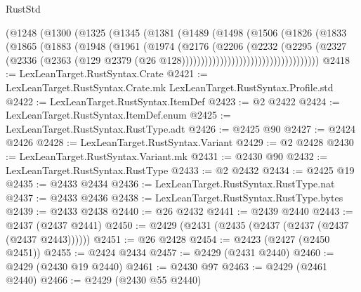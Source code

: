 \begin{lexlean}{RustStd}
\begin{coremodule}
                            (@1248
                              (@1300
                                (@1325
                                  (@1345
                                    (@1381
                                      (@1489
                                        (@1498
                                          (@1506
                                            (@1826
                                              (@1833
                                                (@1865
                                                  (@1883
                                                    (@1948
                                                      (@1961
                                                        (@1974
                                                          (@2176
                                                            (@2206
                                                              (@2232
                                                                (@2295
                                                                  (@2327
                                                                    (@2336
                                                                      (@2363
                                                                        (@129
                                                                          @2379
                                                                          (@26
                                                                            @128))))))))))))))))))))))))))))))))))))
@2418 := LexLeanTarget.RustSyntax.Crate
@2421 := LexLeanTarget.RustSyntax.Crate.mk LexLeanTarget.RustSyntax.Profile.std
@2422 := LexLeanTarget.RustSyntax.ItemDef
@2423 := @2 @2422
@2424 := LexLeanTarget.RustSyntax.ItemDef.enum
@2425 := LexLeanTarget.RustSyntax.RustType.adt
@2426 := @2425 @90
@2427 := @2424 @2426
@2428 := LexLeanTarget.RustSyntax.Variant
@2429 := @2 @2428
@2430 := LexLeanTarget.RustSyntax.Variant.mk
@2431 := @2430 @90
@2432 := LexLeanTarget.RustSyntax.RustType
@2433 := @2 @2432
@2434 := @2425 @19
@2435 := @2433 @2434
@2436 := LexLeanTarget.RustSyntax.RustType.nat
@2437 := @2433 @2436
@2438 := LexLeanTarget.RustSyntax.RustType.bytes
@2439 := @2433 @2438
@2440 := @26 @2432
@2441 := @2439 @2440
@2443 := @2437 (@2437 @2441)
@2450 := @2429 (@2431 (@2435 (@2437 (@2437 (@2437 (@2437 @2443))))))
@2451 := @26 @2428
@2454 := @2423 (@2427 (@2450 @2451))
@2455 := @2424 @2434
@2457 := @2429 (@2431 @2440)
@2460 := @2429 (@2430 @19 @2440)
@2461 := @2430 @97
@2463 := @2429 (@2461 @2440)
@2466 := @2429 (@2430 @55 @2440)

\end{coremodule}
\end{lexlean}
